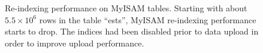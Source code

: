 \begin{figure}[h]
\centering
\def\svgwidth{0.8\textwidth}

\caption[Re-indexing performance on MyISAM tables]{
	Re-indexing performance on MyISAM tables. Starting with about $5.5\times10^6$
	rows in the table ``ests'', MyISAM re-indexing performance starts to drop.
	The indices had been disabled prior to data upload in order to improve upload
	performance. 
}
\label{fig:transaction-time}
\end{figure}
